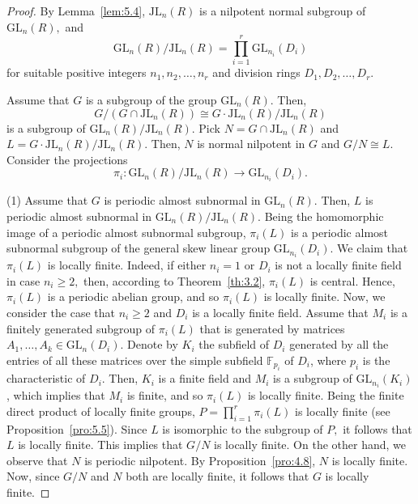 \documentclass{amsart}
\theoremstyle{definition}
\begin{document}
\begin{proof} By Lemma~\ref{lem:5.4}, $\mathrm{JL}_n(R)$ is a nilpotent normal subgroup of $\mathrm{GL}_n(R),$ and $$\mathrm{GL}_n(R)/\mathrm{JL}_n(R)= \prod_{i=1}^{r}\mathrm{GL}_{n_i}(D_i)$$ for suitable positive integers $n_1, n_2,\ldots, n_r$ and division rings $D_1, D_2,\ldots, D_r.$ 
	
	Assume that $G$ is a subgroup of the group $\mathrm{GL}_n(R).$ Then, $$G/(G\cap \mathrm{JL}_n(R))\cong G\cdot\mathrm{JL}_n(R)/\mathrm{JL}_n(R)$$ is a subgroup of $\mathrm{GL}_n(R)/\mathrm{JL}_n(R).$ Pick $N=G\cap \mathrm{JL}_n(R)$ and $L=G\cdot\mathrm{JL}_n(R)/\mathrm{JL}_n(R).$ Then, $N$ is normal nilpotent in $G$ and $G/N\cong L.$ Consider the projections $$\pi_i: \mathrm{GL}_n(R)/\mathrm{JL}_n(R)\longrightarrow \mathrm{GL}_{n_i}(D_i).$$ 
	
(1) Assume that $G$ is periodic almost subnormal in $\mathrm{GL}_n(R).$ Then, $L$ is periodic almost subnormal in $\mathrm{GL}_n(R)/\mathrm{JL}_n(R).$ Being the homomorphic image of a periodic almost subnormal subgroup, $\pi_i(L)$ is a periodic almost subnormal subgroup of the general skew linear group $\mathrm{GL}_{n_i}(D_i).$ We claim that $\pi_i(L)$ is locally finite. Indeed, if either $n_i=1$ or $D_i$ is not a locally finite field in case $n_i\geq 2,$ then, according to Theorem~\ref{th:3.2}, $\pi_i(L)$ is central. Hence, $\pi_i(L)$ is a periodic abelian group, and so $\pi_i(L)$ is locally finite. Now, we consider the case that $n_i\geq 2$ and $D_i$ is a locally finite field. Assume that $M_i$ is a finitely generated subgroup of $\pi_i(L)$ that is generated by matrices $A_1, \dots, A_k\in \mathrm{GL}_n(D_i)$. Denote by $K_i$ the subfield of $D_i$ generated by all the entries of all these matrices over the simple subfield $\mathbb{F}_{p_i}$ of $D_i$, where $p_i$ is the characteristic of $D_i$. Then, $K_i$ is a finite field and $M_i$ is a subgroup of $\mathrm{GL}_{n_i}(K_i)$, which implies that $M_i$ is finite, and so $\pi_i(L)$ is locally finite. Being the finite direct product of locally finite groups, $P=\prod_{i=1}^{r} \pi_i(L)$ is locally finite (see Proposition~\ref{pro:5.5}). Since $L$ is isomorphic to the subgroup of $P,$ it follows that $L$ is locally finite. This implies that $G/N$ is locally finite. On the other hand, we observe that $N$ is periodic nilpotent. By Proposition~\ref{pro:4.8}, $N$ is locally finite. Now, since  $G/N$ and $N$ both are locally finite, it follows that $G$ is locally finite. 
	

\end{proof}
\end{document}
